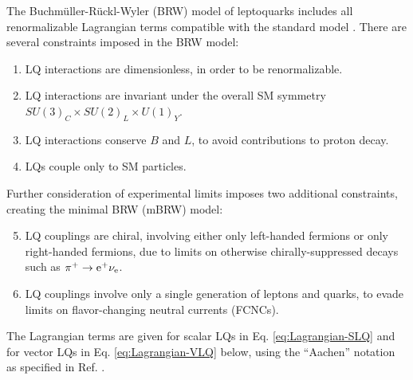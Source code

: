 \documentclass[12pt]{thesis}  %
\newcommand{\Pe}{\ensuremath{\cmsSymbolFace{e}}\xspace}
\begin{document}
The Buchm\"{u}ller-R\"{u}ckl-Wyler (BRW) model of leptoquarks includes all renormalizable Lagrangian terms compatible with the standard model \cite{BRW}. There are several constraints imposed in the BRW model:
\begin{enumerate}
\item LQ interactions are dimensionless, in order to be renormalizable.
\item LQ interactions are invariant under the overall SM symmetry \linebreak[4] ${SU(3)_{C} \times SU(2)_{L} \times U(1)_{Y}}$.
\item LQ interactions conserve $B$ and $L$, to avoid contributions to proton decay.
\item LQs couple only to SM particles.
\end{enumerate}
Further consideration of experimental limits imposes two additional constraints, creating the minimal BRW (mBRW) model:
\begin{enumerate}
\setcounter{enumi}{4}
\item LQ couplings are chiral, involving either only left-handed fermions or only right-handed fermions, due to limits on otherwise chirally-suppressed decays such as $\pi^{+} \rightarrow \Pe^{+} \nu_{\Pe}$.
\item LQ couplings involve only a single generation of leptons and quarks, to evade limits on flavor-changing neutral currents (FCNCs).
\end{enumerate}
The Lagrangian terms are given for scalar LQs in Eq. \eqref{eq:Lagrangian-SLQ} and for vector LQs in Eq. \eqref{eq:Lagrangian-VLQ} below, using the ``Aachen'' notation as specified in Ref. \cite{ModelIndLQ}.
\end{document}
